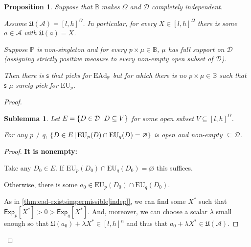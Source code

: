\documentclass[a4paper,final]{article}
\newtheorem{proposition}[theorem]{Proposition}
\newtheorem{sublemma}{Sublemma}[theorem]
\newcommand\A{\mathcal{A}}
\renewcommand\P{\mathbb{P}} %
\newcommand\Exp{\mathsf{Exp}}
\newcommand\EU{\mathrm{EU}}
\newcommand\EAd{\mathrm{EAd}}
\newcommand\U{\mathfrak{U}} %
\newcommand{\D}{\mathcal{D}}
\newcommand{\Decs}{\mathcal{D}}
\newcommand\s{\mathsf{s}}
\newcommand{\IB}{\mathbb{B}}
\newcommand{\IP}{\P}
\newcommand\SetDelimiter[1][]{
	\nonscript\,#1\vert \allowbreak \nonscript\,\mathopen{}}
\providecommand\given{\SetDelimiter}
\renewcommand{\emptyset}{\varnothing}
\newenvironment{CCM rewritten}
{\begingroup\color{blue}} %
{\endgroup}              %
\begin{document}
\begin{proposition}\label{thm:ead-existsimpermissible[dep]:spreadeg}Suppose that $\IB$ makes $\Omega$ and $\Decs$ completely independent. 
	
	Assume $\U(\A)=[l,h]^\Omega$. In particular, for every $X\in [l,h]^\Omega$ there is some $a\in \A$ with $\U(a)=X$. 
	
	Suppose $\IP$ is non-singleton and for every $p \times \mu\in\IB$, $\mu$ has full support on $\Decs$ (assigning strictly positive measure to every non-empty open subset of $\Decs$).
	
	Then there is $\s$ that picks for $\EAd_\IP$ but for which there is no $p\times\mu\in \IB$ such that $\s$ $\mu$-surely pick for $\EU_p$.
	
\end{proposition}
\begin{proof}
	\begin{sublemma}
		Let $E = \{D\in\D\given D\subseteq V\}$ for some open subset $V \subseteq [l,h]^\Omega$.
		
		For any $p\neq q$,
		$\{D\in E\given \EU_{p}(D)\cap \EU_{q}(D)=\emptyset\}$ is open and non-empty $\subseteq\Decs$.
	\end{sublemma}
	\begin{proof}
		
		
		
		\textbf{It is nonempty:}
		
		Take any $D_0\in E$. If $\EU_{p}(D_0)\cap \EU_{q}(D_0)=\emptyset$ this suffices. 
		
		Otherwise, there is some $a_0\in \EU_{p}(D_0)\cap \EU_{q}(D_0)$. 
		
		As in \cref{thm:ead-existsimpermissible[indep]}, we can find some $X^*$ such that $\Exp_{p}[X^*]>0>\Exp_{q}[X^*]$. And, moreover, we can choose a scalar $\lambda$ small enough so that $\U(a_0)+\lambda X^*\in[l,h]^n$ and thus that $a_0+\lambda X^*\in\U(\A)$.%
		

\end{proof}
\end{proof}
\end{document}
